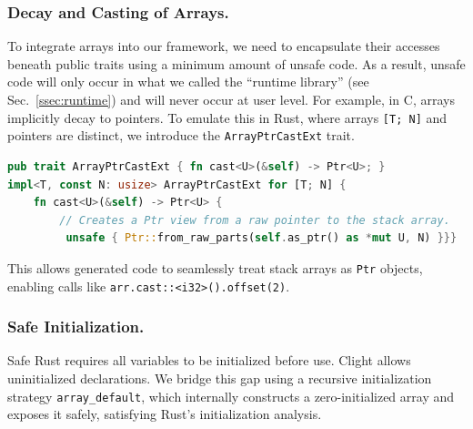 \documentclass{llncs} %
\begin{document}

\subsubsection{Decay and Casting of Arrays.}
%
To integrate arrays into our framework, we need to encapsulate their accesses beneath public traits using a minimum amount of unsafe code. As a result, unsafe code will only occur in what we called the ``runtime library'' (see Sec.~\ref{ssec:runtime}) and will never occur at user level.
%
For example, in C, arrays implicitly decay to pointers. To emulate this in Rust, where arrays \texttt{[T; N]} and pointers are distinct, we introduce the \texttt{ArrayPtrCastExt} trait.
\begin{lstlisting}[language=Rust]
pub trait ArrayPtrCastExt { fn cast<U>(&self) -> Ptr<U>; }
impl<T, const N: usize> ArrayPtrCastExt for [T; N] {
    fn cast<U>(&self) -> Ptr<U> {
        // Creates a Ptr view from a raw pointer to the stack array.
         unsafe { Ptr::from_raw_parts(self.as_ptr() as *mut U, N) }}}
\end{lstlisting}
This allows generated code to seamlessly treat stack arrays as \texttt{Ptr} objects, enabling calls like \texttt{arr.cast::<i32>().offset(2)}.

\subsubsection{Safe Initialization.}
Safe Rust requires all variables to be initialized before use. Clight allows uninitialized declarations. We bridge this gap using a recursive initialization strategy \texttt{array\_default}, which internally constructs a zero-initialized array and exposes it safely, satisfying Rust's initialization analysis.
\end{document}
